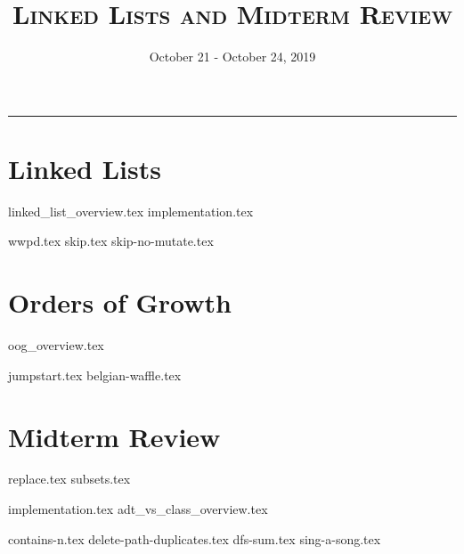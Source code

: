 \documentclass{exam}
\title{\textsc{Linked Lists and Midterm Review}}
\date{October 21 - October 24, 2019}
\begin{document}
\maketitle
\rule{\textwidth}{0.15em}
\fontsize{12}{15}\selectfont

\section{Linked Lists}
{linked_list_overview.tex}
{implementation.tex}
\newpage
\begin{questions}
{wwpd.tex}
\newpage
{skip.tex}
{skip-no-mutate.tex}
\end{questions}
\newpage

\section{Orders of Growth}
{oog_overview.tex}
\begin{questions}
{jumpstart.tex}
{belgian-waffle.tex}
\end{questions}

\section{Midterm Review}
\begin{questions}
{replace.tex}
{subsets.tex}
\end{questions}
\newpage
{implementation.tex}
{adt_vs_class_overview.tex}
\vspace{\baselineskip}
\begin{questions}
{contains-n.tex}
{delete-path-duplicates.tex}
\newpage
{dfs-sum.tex}
{sing-a-song.tex}

\end{questions}
\end{document}

